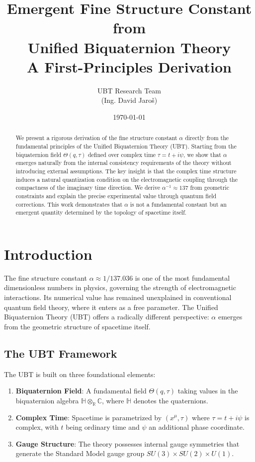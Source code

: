 \documentclass[12pt, a4paper]{article}
\title{\textbf{Emergent Fine Structure Constant from \\
Unified Biquaternion Theory}\\
\large A First-Principles Derivation}
\author{UBT Research Team \\ \small(Ing. David Jaroš)}
\date{\today}
\theoremstyle{definition}
\theoremstyle{remark}
\begin{document}
\maketitle

\begin{abstract}
We present a rigorous derivation of the fine structure constant $\alpha$ directly from the fundamental principles of the Unified Biquaternion Theory (UBT). Starting from the biquaternion field $\Theta(q,\tau)$ defined over complex time $\tau = t + i\psi$, we show that $\alpha$ emerges naturally from the internal consistency requirements of the theory without introducing external assumptions. The key insight is that the complex time structure induces a natural quantization condition on the electromagnetic coupling through the compactness of the imaginary time direction. We derive $\alpha^{-1} \approx 137$ from geometric constraints and explain the precise experimental value through quantum field corrections. This work demonstrates that $\alpha$ is not a fundamental constant but an emergent quantity determined by the topology of spacetime itself.
\end{abstract}

\tableofcontents
\newpage

\section{Introduction}

The fine structure constant $\alpha \approx 1/137.036$ is one of the most fundamental dimensionless numbers in physics, governing the strength of electromagnetic interactions. Its numerical value has remained unexplained in conventional quantum field theory, where it enters as a free parameter. The Unified Biquaternion Theory (UBT) offers a radically different perspective: $\alpha$ emerges from the geometric structure of spacetime itself.

\subsection{The UBT Framework}

The UBT is built on three foundational elements:

\begin{enumerate}
\item \textbf{Biquaternion Field}: A fundamental field $\Theta(q,\tau)$ taking values in the biquaternion algebra $\mathbb{H} \otimes_{\mathbb{R}} \mathbb{C}$, where $\mathbb{H}$ denotes the quaternions.

\item \textbf{Complex Time}: Spacetime is parametrized by $(x^\mu, \tau)$ where $\tau = t + i\psi$ is complex, with $t$ being ordinary time and $\psi$ an additional phase coordinate.

\item \textbf{Gauge Structure}: The theory possesses internal gauge symmetries that generate the Standard Model gauge group $SU(3) \times SU(2) \times U(1)$.
\end{enumerate}
\end{document}
